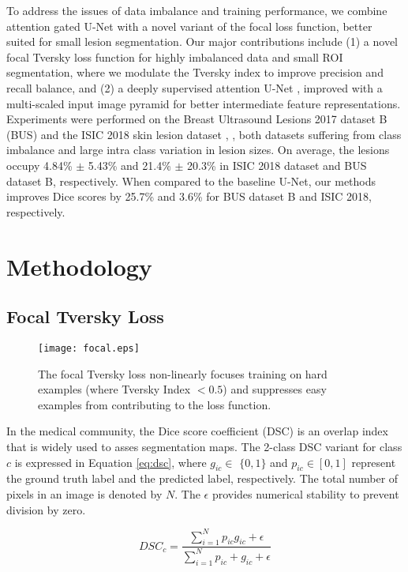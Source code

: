 \documentclass{article}
\begin{document}
To address the issues of data imbalance and training performance, we combine attention gated U-Net with a novel variant of the focal loss function, better suited for small lesion segmentation. Our major contributions include (1) a novel focal Tversky loss function for highly imbalanced data and small ROI segmentation, where we modulate the Tversky index \cite{tversky} to improve precision and recall balance, and (2) a deeply supervised attention U-Net \cite{oktay}, improved with a multi-scaled input image pyramid for better intermediate feature representations. Experiments were performed on the Breast Ultrasound Lesions 2017 dataset B (BUS) \cite{yap} and the ISIC 2018 skin lesion dataset \cite{isic1}, \cite{isic2}, both datasets suffering from class imbalance and large intra class variation in lesion sizes. On average, the lesions occupy 4.84\% $\pm$ 5.43\% and 21.4\% $\pm$ 20.3\% in ISIC 2018 dataset and BUS dataset B, respectively. When compared to the baseline U-Net, our methods improves Dice scores by 25.7\% and 3.6\% for BUS dataset B and ISIC 2018, respectively.

\section{Methodology}

\subsection{Focal Tversky Loss}

\begin{figure}[h]
	\centering
	\texttt{[image: focal.eps]}	
	\caption{The focal Tversky loss non-linearly focuses training on hard examples (where Tversky Index $<0.5$) and suppresses easy examples from contributing to the loss function. }
	\label{fig:focal}
\end{figure}    

In the medical community, the Dice score coefficient (DSC) is an overlap index that is widely used to asses segmentation maps. The 2-class DSC variant for class $c$ is expressed in Equation \ref{eq:dsc}, where $g_{ic} \in$ $\{0,1\}$  and $p_{ic} \in [0,1]$ represent the ground truth label and the predicted label, respectively. The total number of pixels in an image is denoted by $N$. The $\epsilon$ provides numerical stability to prevent division by zero. 

\begin{equation}
  DSC_c = \frac{\sum_{i=1} ^N p_{ic} g_{ic} + \epsilon}{\sum_{i=1} ^N p_{ic} + g_{ic} + \epsilon} 
\label{eq:dsc} 
\end{equation}
\end{document}
